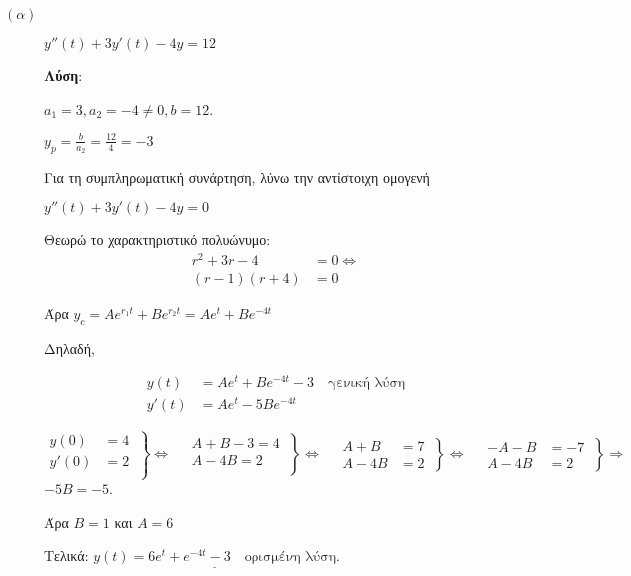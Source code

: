 \documentclass[a4paper,12pt]{article}
\begin{document}
\begin{description}

\item [$(\alpha)$] $\boxed{y''(t)+3y'(t) -4y=12}$

\textbf{Λύση}:

\vspace{\baselineskip}

$a_1=3, a_2=-4\neq 0, b=12$.

$y_p=\frac{b}{a_2}=\frac{12}{4}=-3$

Για τη συμπληρωματική συνάρτηση, λύνω την αντίστοιχη ομογενή

$y''(t) + 3y'(t) -4y = 0$

Θεωρώ το χαρακτηριστικό πολυώνυμο:
\begin{align*}
r^2+3r-4&=0 \Leftrightarrow \\
(r-1)(r+4)&=0
\end{align*}

Άρα $y_c=Ae^{r_1t} + Be^{r_2t} = Ae^t + Be^{-4t}$

Δηλαδή,

\begin{align*}
y(t) &= Ae^t + Be^{-4t} -3 \quad \text{γενική λύση} \\
y'(t) &= Ae^t-5Be^{-4t}
\end{align*}

\[
  \left.\begin{aligned}
y(0)&=4 \\
y'(0)&=2\\
  \end{aligned}\:\right\}\Leftrightarrow \quad
 \left.\begin{aligned}
A+B-3=4 \\
A-4B=2\\
  \end{aligned}\:\right\}\Leftrightarrow \quad
 \left.\begin{aligned}
A+B&=7 \\
A-4B&=2
  \end{aligned}\:\right\}\Leftrightarrow \quad
 \left.\begin{aligned}
-A-B&=-7 \\
A-4B&=2
  \end{aligned}\:\right\}\Rightarrow
\]
$-5Β=-5$.

Άρα $B=1$ και $A=6$

Τελικά: $\underline{y(t) = 6e^t+e^{-4t} -3 \quad \text{ορισμένη λύση}}$.

\vspace{\baselineskip}


\end{description}
\end{document}
